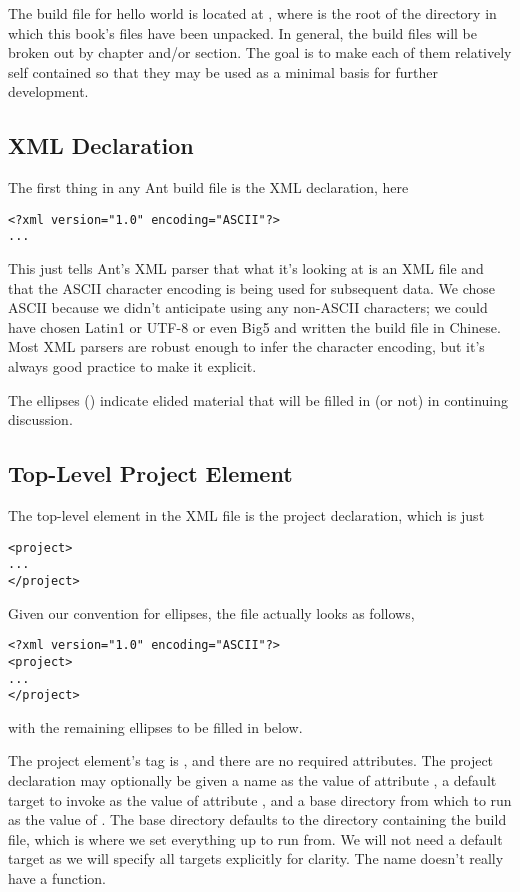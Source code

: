 The build file for hello world is located at
, where \relpath{} is the root of the
directory in which this book's files have been unpacked.  In general, the
build files will be broken out by chapter and/or section.  The goal is
to make each of them relatively self contained so that they may be
used as a minimal basis for further development.

\subsection{XML Declaration}

The first thing in any Ant build file is the XML declaration, here
%
\begin{verbatim}
<?xml version="1.0" encoding="ASCII"?>
...
\end{verbatim}
%
This just tells Ant's XML parser that what it's looking at is an XML
file and that the ASCII character encoding is being used for
subsequent data.  We chose ASCII because we didn't anticipate using
any non-ASCII characters; we could have chosen Latin1 or UTF-8 or even
Big5 and written the build file in Chinese.  Most XML parsers are
robust enough to infer the character encoding, but it's always good
practice to make it explicit.

The ellipses () indicate elided material that will be
filled in (or not) in continuing discussion.  

\subsection{Top-Level Project Element} 

The top-level element in the XML file is the project declaration,
which is just
%
\begin{verbatim}
<project>
...
</project>
\end{verbatim}
%
Given our convention for ellipses, the file actually looks as follows,

\begin{verbatim}
<?xml version="1.0" encoding="ASCII"?>
<project>
...
</project>
\end{verbatim}
%
with the remaining ellipses to be filled in below.

The project element's tag is , and there are no required
attributes.  The project declaration may optionally be given a name as
the value of attribute , a default target to invoke as the
value of attribute , and a base directory from which to
run as the value of .  The base directory defaults
to the directory containing the build file, which is where we set
everything up to run from.  We will not need a default target as we
will specify all targets explicitly for clarity.  The name doesn't
really have a function.

